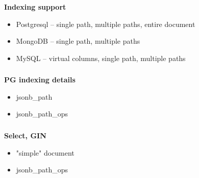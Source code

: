 \documentclass[usenames,dvipsnames, 18pt, compress, aspectratio=169]{beamer}
\begin{document}
\begin{frame}
    \frametitle{}
    \textbf{Indexing support}
    \begin{center}
        \begin{itemize}[label={\MVRightarrow}]
            \item Postgresql -- single path, multiple paths, entire document
            \item MongoDB -- single path, multiple paths
            \item MySQL -- virtual columns, single path, multiple paths
        \end{itemize}
    \end{center}
\end{frame}

\begin{frame}
    \frametitle{}
    \textbf{PG indexing details}
    \begin{center}
        \begin{itemize}[label={\MVRightarrow}]
            \item jsonb\_path
            \item jsonb\_path\_ops
        \end{itemize}
    \end{center}
\end{frame}

\begin{frame}
    \frametitle{}
    \begin{center}
        \textbf{Select, GIN}
        \begin{itemize}[label={}]
            \item "simple" document
            \item jsonb\_path\_ops
        \end{itemize}
    \end{center}
\end{frame}
\end{document}

